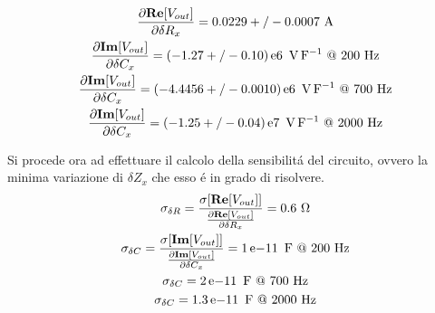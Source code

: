\begin{gather}
	\frac{\partial \mathbf{Re}[V_{out}]}{\partial \delta R_x} = 0.0229+/-0.0007 \ \si{\ampere} \\
	\frac{\partial \mathbf{Im}[V_{out}]}{\partial \delta C_x} = (-1.27+/-0.10)\E{6} \ \si{\volt\per\farad} \ @ \  200 \ \si{\hertz}\\
	\frac{\partial \mathbf{Im}[V_{out}]}{\partial \delta C_x} = (-4.4456+/-0.0010)\E{6} \ \si{\volt\per\farad} \ @ \  700 \ \si{\hertz}\\
	\frac{\partial \mathbf{Im}[V_{out}]}{\partial \delta C_x} = (-1.25+/-0.04)\E{7} \ \si{\volt\per\farad} \ @ \  2000 \ \si{\hertz}
\end{gather}

Si procede ora ad effettuare il calcolo della sensibilit\'a del circuito, ovvero la minima variazione di $\delta Z_x$ che esso \'e in grado di risolvere. \\
\begin{gather}
	\sigma_{\delta R} = \frac{ \sigma[\mathbf{Re}[V_{out}]] }{ \frac{\partial \mathbf{Re}[V_{out}]}{\partial \delta R_x}} = 0.6\ \si{\ohm} \\
	\sigma_{\delta C}=\frac{\sigma [\mathbf{Im}[V_{out}]]}{\frac{\partial \mathbf{Im}[V_{out}]}{\partial \delta C_x}} = 1\E{-11} \ \si{\farad} \ @ \  200 \ \si{\hertz} \\
	\sigma_{\delta C}= 2\E{-11} \ \si{\farad} \ @ \  700 \ \si{\hertz} \\
	\sigma_{\delta C}= 1.3\E{-11} \ \si{\farad} \ @ \  2000 \ \si{\hertz}
\end{gather}

